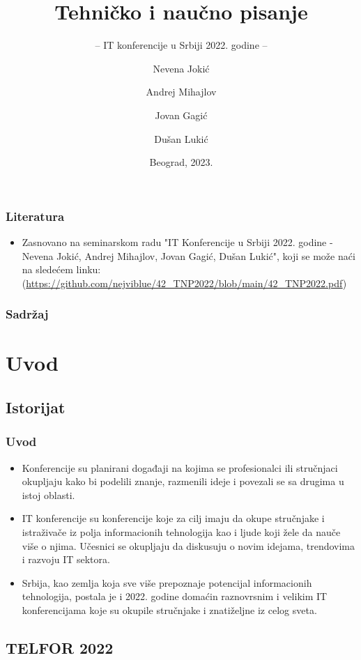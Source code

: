 \documentclass{beamer}
\title{Tehničko i naučno pisanje}
\subtitle{-- IT konferencije u Srbiji 2022. godine --}
\author{Nevena Jokić \and Andrej Mihajlov\\ \and Jovan Gagić \and Dušan Lukić}
\institute{Matematički fakultet\\Univerzitet u Beogradu}
\date{
	\footnotesize{Beograd, 2023.}	
}
\begin{document}
\begin{frame}
	\thispagestyle{empty}
	\titlepage
\end{frame}

\addtocounter{framenumber}{-1}

\begin{frame}[fragile]\frametitle{Literatura}
	\begin{itemize}
		\item Zasnovano na seminarskom radu "IT Konferencije u Srbiji 2022. godine - Nevena Jokić, Andrej Mihajlov, Jovan Gagić, Dušan Lukić", koji se može naći na sledećem linku:
		(\url{https://github.com/nejviblue/42_TNP2022/blob/main/42_TNP2022.pdf})
	\end{itemize}
\end{frame}

\begin{frame}
	\frametitle{Sadržaj}
	\tableofcontents[] 
\end{frame}
\section{Uvod}

\subsection{Istorijat}

\begin{frame}[fragile]\frametitle{Uvod}
	\begin{itemize}	
		\item Konferencije su planirani događaji na kojima se profesionalci ili stručnjaci okupljaju kako bi podelili znanje, razmenili ideje i povezali se sa drugima u istoj oblasti.
		\item IT konferencije su konferencije koje za cilj imaju da okupe stručnjake i istraživače iz polja informacionih tehnologija kao i ljude koji žele da nauče više o njima. Učesnici se okupljaju da diskusuju o novim idejama, trendovima i razvoju IT sektora.
       \item  Srbija, kao zemlja koja sve više prepoznaje potencijal informacionih tehnologija, postala je i 2022. godine domaćin raznovrsnim i velikim IT konferencijama koje su okupile stručnjake i znatiželjne iz celog sveta.
	\end{itemize}
\end{frame}

\subsection{TELFOR 2022}
\end{document}
